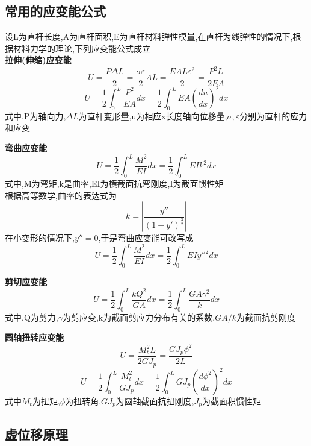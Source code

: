 \documentclass{book}
\begin{document}
\subsection{常用的应变能公式}
设L为直杆长度,A为直杆面积,E为直杆材料弹性模量,在直杆为线弹性的情况下,根据材料力学的理论,下列应变能公式成立\\
\textbf{拉伸(伸缩)应变能}
\begin{equation}
 U=\frac{P\Delta L}{2}=\frac{\sigma \varepsilon}{2}AL=\frac{EAL\varepsilon^2}{2}=\frac{P^2L}{2EA}
\end{equation}
\begin{equation}
 U=\frac{1}{2}\int_{0}^{L}\frac{P^2}{EA}dx=\frac{1}{2}\int_{0}^{L}EA(\frac{du}{dx})^2dx
\end{equation}
式中,P为轴向力,$\Delta L$为直杆变形量,u为相应x长度轴向位移量,$\sigma,\varepsilon$分别为直杆的应力和应变

\textbf{弯曲应变能}
\begin{equation}
 U=\frac{1}{2}\int_{0}^{L}\frac{M^2}{EI}dx=\frac{1}{2}\int_{0}^{L}EIk^2dx
\end{equation}
式中,M为弯矩,k是曲率,EI为横截面抗弯刚度,I为截面惯性矩\\
根据高等数学,曲率的表达式为
\begin{equation}
 k=|\frac{y''}{(1+y')^{\frac{3}{2}}}|
\end{equation}
在小变形的情况下,$y''=0$,于是弯曲应变能可改写成
\begin{equation}
 U=\frac{1}{2}\int_{0}^{L}\frac{M^2}{EI}dx=\frac{1}{2}\int_{0}^{L}EIy''^2dx
\end{equation}

\textbf{剪切应变能}
\begin{equation}
 U=\frac{1}{2}\int_{0}^{L}\frac{kQ^2}{GA}dx=\frac{1}{2}\int_{0}^{L}\frac{GA\gamma^2}{k}dx
\end{equation}
式中,Q为剪力,$\gamma$为剪应变,k为截面剪应力分布有关的系数,$GA/k$为截面抗剪刚度

\textbf{园轴扭转应变能}
\begin{equation}
 U=\frac{M_t^2 L}{2GJ_p}=\frac{GJ_p\phi^2}{2L}
\end{equation}
\begin{equation}
 U=\frac{1}{2}\int_{0}^{L}\frac{M_t^2}{GJ_p}dx=\frac{1}{2}\int_{0}^{L}GJ_p(\frac{d\phi^2}{dx})^2dx
\end{equation}
式中$M_t$为扭矩,$\phi$为扭转角,$GJ_p$为圆轴截面抗扭刚度,$J_p$为截面积惯性矩

\subsection{虚位移原理}
\end{document}
